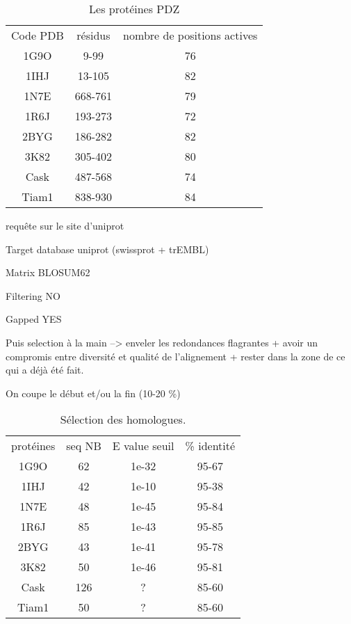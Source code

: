     \clearpage


    \begin{table}[!htbp]
      \centering

      \begin{tabular}{ccc}

        \toprule
        Code PDB & résidus & nombre de positions actives\\
        \cmidrule{1-3}
        1G9O  & 	9-99	 & 	76	 \\
        1IHJ  & 	13-105	 & 	82	 \\
        1N7E  & 	668-761	 & 	79	 \\
        1R6J  & 	193-273	 & 	72	 \\
        2BYG  & 	186-282	 & 	82	 \\
        3K82  & 	305-402	 & 	80	 \\
        Cask  & 	487-568	 & 	74	 \\
        Tiam1 & 	838-930	 & 	84	 \\
        \bottomrule

      \end{tabular}      
      \caption{Les protéines PDZ}
\label{tab:protéines_PDZ}      
    \end{table}



requête sur le site d'uniprot

Target database uniprot (swissprot + trEMBL)

Matrix BLOSUM62

Filtering NO

Gapped YES


Puis selection à la main -->
enveler les redondances flagrantes
 + avoir un compromis entre diversité et qualité de l'alignement
 + rester dans la zone de ce qui a déjà été fait.

On coupe le début et/ou la fin (10-20 \%)



    \begin{table}[!htbp]
      \centering

      \begin{tabular}{cccc}

        \toprule
        protéines & seq NB & E value seuil & \% identité \\
        \cmidrule{1-4}
     1G9O  & 62  &    1e-32  &  95-67 \\
     1IHJ  & 42  &    1e-10  &  95-38 \\
     1N7E  & 48  &    1e-45  &  95-84 \\
     1R6J  & 85  &    1e-43  &  95-85 \\
     2BYG  & 43  &    1e-41  &  95-78 \\
     3K82  & 50  &    1e-46  &  95-81 \\
     Cask  & 126 &    ?      &  85-60 \\
     Tiam1 & 50  &    ?      &  85-60 \\

        \bottomrule

      \end{tabular}      
      \caption{Sélection des homologues.}
\label{tab:select_homo}      
    \end{table}



